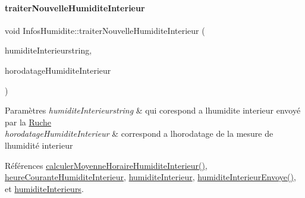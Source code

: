 \paragraph{\texorpdfstring{traiter\+Nouvelle\+Humidite\+Interieur}{traiterNouvelleHumiditeInterieur}}
{\footnotesize\ttfamily void Infos\+Humidite\+::traiter\+Nouvelle\+Humidite\+Interieur (\begin{DoxyParamCaption}\item[{Q\+String}]{humidite\+Interieurstring,  }\item[{Q\+String}]{horodatage\+Humidite\+Interieur }\end{DoxyParamCaption})\hspace{0.3cm}{\ttfamily [slot]}}


\begin{DoxyParams}{Paramètres}
{\em humidite\+Interieurstring} & qui corespond a l\textquotesingle{}humidite interieur envoyé par la \hyperlink{class_ruche}{Ruche} \\
\hline
{\em horodatage\+Humidite\+Interieur} & correspond a l\textquotesingle{}horodatage de la mesure de l\textquotesingle{}humidité interieur \\
\hline
\end{DoxyParams}


Références \hyperlink{class_infos_humidite_acd903311f6c949f8f010b330f517e4f3}{calculer\+Moyenne\+Horaire\+Humidite\+Interieur()}, \hyperlink{class_infos_humidite_a5a8597751ba0fe10a14a12e155421485}{heure\+Courante\+Humidite\+Interieur}, \hyperlink{class_infos_humidite_ad2847e671ad0b90f8dc0940dee107c38}{humidite\+Interieur}, \hyperlink{class_infos_humidite_aa0eb7d8a609b837e1b450b7d79e1ff81}{humidite\+Interieur\+Envoye()}, et \hyperlink{class_infos_humidite_a2bcd5b3629a007078d4e15d110dae457}{humidite\+Interieurs}.


